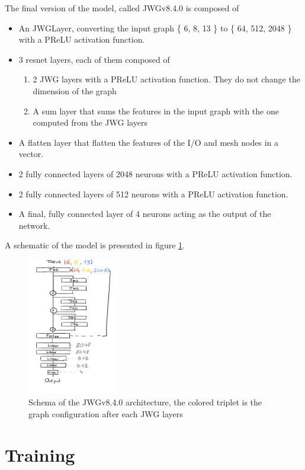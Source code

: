 \documentclass[../main.tex]{subfiles}
\begin{document}
The final version of the model, called JWGv8.4.0 is composed of
\begin{itemize}
  \item An JWGLayer, converting the input graph \{{\color{red} 6}, {\color{Dandelion} 8}, {\color{blue} 13} \} to \{ 64, 512, 2048 \} with a PReLU activation function.
  \item 3 resnet layers, each of them composed of
    \begin{enumerate}
      \item 2 JWG layers with a PReLU activation function. They do not change the dimension of the graph
      \item A sum layer that sums the features in the input graph with the one computed from the JWG layers
    \end{enumerate}
  \item A flatten layer that flatten the features of the I/O and mesh nodes in a vector.
  \item 2 fully connected layers of 2048 neurons with a PReLU activation function.
  \item 2 fully connected layers of 512 neurons with a PReLU activation function.
  \item A final, fully connected layer of 4 neurons acting as the output of the network.
\end{itemize}
A schematic of the model is presented in figure \ref{fig:jgnn:model-schematic}.


\begin{figure}
  \centering
  \includegraphics[height=6cm]{images/jgnn/jwgv8_4.png}
  \caption{Schema of the JWGv8.4.0 architecture, the colored triplet is the graph configuration after each JWG layers}
  \label{fig:jgnn:model-schematic}
\end{figure}


\section{Training}
\end{document}
